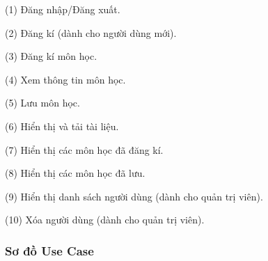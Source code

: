 \documentclass{article}
\begin{document}
		(1) Đăng nhập/Đăng xuất.
		
		(2) Đăng kí (dành cho người dùng mới).
		
		(3) Đăng kí môn học.
		
		(4) Xem thông tin môn học.
		
		(5) Lưu môn học.
		
		(6) Hiển thị và tải tài liệu.
		
		(7) Hiển thị các môn học đã đăng kí.
		
		(8) Hiển thị các môn học đã lưu.
		
		(9) Hiển thị danh sách người dùng (dành cho quản trị viên).
		
		(10) Xóa người dùng (dành cho quản trị viên).
	
	\subsubsection{Sơ đồ Use Case}
\end{document}

